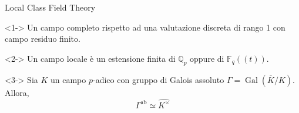 \documentclass[pdf]{beamer}
\def\Q{\mathbb{Q}}
\def\K{K}
\def\Ks{\overline{\K}}
\begin{document}
\begin{frame}[fragile]{Local Class Field Theory}
	\begin{definition}<1->
		Un campo completo rispetto ad una valutazione discreta di rango 1 con campo residuo finito.
	\end{definition}
	\begin{example}<2->
		Un campo locale è un estensione finita di $\Q_p$ oppure di $\mathbb{F}_q((t))$.
	\end{example}
	\begin{theorem}<3->
		Sia $K$ un campo $p$-adico con gruppo di Galois assoluto $\Gamma=\operatorname{Gal}{(\Ks /K)}$. Allora,
		\[
			\Gamma^\text{ab} \simeq \widehat{K^\times}
		\]
	\end{theorem}

\end{frame}
\end{document}
